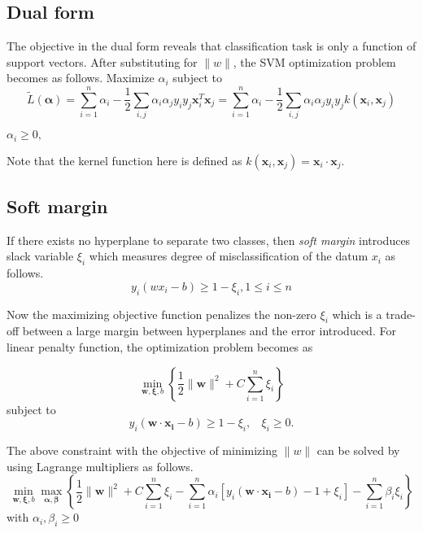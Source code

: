 \subsection{Dual form}

The objective in the dual form reveals that classification task is 
only a function of support vectors. After substituting for $\|w\|$, the SVM optimization problem becomes
as follows.
Maximize $\alpha_i$
subject to
\begin{equation}
    \tilde{L}(\mathbf{\alpha})=\sum_{i=1}^n \alpha_i - \frac{1}{2}\sum_{i, j} \alpha_i \alpha_j y_i y_j \mathbf{x}_i^T \mathbf{x}_j=\sum_{i=1}^n \alpha_i - \frac{1}{2}\sum_{i, j} \alpha_i \alpha_j y_i y_j k(\mathbf{x}_i, \mathbf{x}_j) 
\end{equation}

$\alpha_i \geq 0,\, $

Note that the kernel function here is defined as 
$k(\mathbf{x}_i,\mathbf{x}_j)=\mathbf{x}_i\cdot\mathbf{x}_j$.
    
\subsection{Soft margin}
If there exists no hyperplane to separate two classes, then \emph{soft margin} introduces slack 
variable $\xi_i$  which measures degree of misclassification of the datum $x_i$ as follows. 
\begin{equation}
y_i(wx_i-b) \ge 1 - \xi_i, 1 \le i \le n
\end{equation}

Now the maximizing objective function penalizes the non-zero $\xi_i$ which is a trade-off between
a large margin between hyperplanes and the error introduced. For linear penalty function, the
optimization problem becomes as

\begin{equation}
    \min_{\mathbf{w},\mathbf{\xi}, b } \left\{\frac{1}{2} \|\mathbf{w}\|^2 + C \sum_{i=1}^n \xi_i \right\} 
\end{equation}
    subject to   
\begin{equation}
y_i(\mathbf{w}\cdot\mathbf{x_i} - b) \ge 1 - \xi_i, ~~~~\xi_i \ge 0 . 
\end{equation}

The above constraint with the objective of minimizing $\|w\|$ can be solved by using Lagrange multipliers as
follows.
\begin{equation}
    \min_{\mathbf{w},\mathbf{\xi}, b } \max_{\boldsymbol{\alpha},\boldsymbol{\beta} } \left \{ \frac{1}{2}\|\mathbf{w}\|^2 +C \sum_{i=1}^n \xi_i - \sum_{i=1}^{n}{\alpha_i[y_i(\mathbf{w}\cdot \mathbf{x_i} - b) -1 + \xi_i]} - \sum_{i=1}^{n} \beta_i \xi_i \right \} 
\end{equation}
with $\alpha_i,\beta_i \ge 0$


